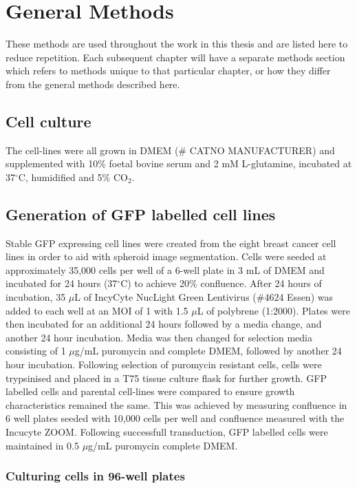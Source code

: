 \documentclass[a4paper,11pt,twoside,openright]{scrbook}
\begin{document}
\chapter{General Methods} \label{chapter:generalMethods}

These methods are used throughout the work in this thesis and are listed here to reduce repetition.
Each subsequent chapter will have a separate methods section which refers to methods unique to that particular chapter, or how they differ from the general methods described here.


\section{Cell culture}
The cell-lines were all grown in DMEM (\# CATNO MANUFACTURER) and supplemented with 10\% foetal bovine serum and 2 mM L-glutamine, incubated at 37$^\circ$C, humidified and 5\% CO$_2$.


\section{Generation of GFP labelled cell lines}
Stable GFP expressing cell lines were created from the eight breast cancer cell lines in order to aid with spheroid image segmentation.
Cells were seeded at approximately 35,000 cells per well of a 6-well plate in 3 mL of DMEM and incubated for 24 hours (37$^\circ$C) to achieve 20\% confluence.
After 24 hours of incubation, 35 $\mu$L of IncyCyte NucLight Green Lentivirus (\#4624 Essen) was added to each well at an  MOI of 1 with 1.5 $\mu$L of polybrene (1:2000).
Plates were then incubated for an additional 24 hours followed by a media change, and another 24 hour incubation.
Media was then changed for selection media consisting of 1 $\mu$g/mL puromycin and complete DMEM, followed by another 24 hour incubation.
Following selection of puromycin resistant cells, cells were trypsinised and placed in a T75 tissue culture flask for further growth.
GFP labelled cells and parental cell-lines were compared to ensure growth characteristics remained the same.
This was achieved by measuring confluence in 6 well plates seeded with 10,000 cells per well and confluence measured with the Incucyte ZOOM.
Following successfull transduction, GFP labelled cells were maintained in 0.5 $\mu$g/mL puromycin complete DMEM.


\subsection{Culturing cells in 96-well plates}
\end{document}
